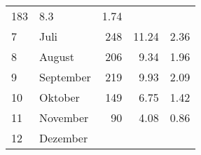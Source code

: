 \begin{longtable}{lXrrr}
       \num{183} &
       \num[round-mode=places,round-precision=2]{8.3} &
         \num[round-mode=places,round-precision=2]{1.74} \\

     7 &
     \multicolumn{1}{X}{ Juli   } &


       \num{248} &
       \num[round-mode=places,round-precision=2]{11.24} &
         \num[round-mode=places,round-precision=2]{2.36} \\

     8 &
     \multicolumn{1}{X}{ August   } &


       \num{206} &
       \num[round-mode=places,round-precision=2]{9.34} &
         \num[round-mode=places,round-precision=2]{1.96} \\

     9 &
     \multicolumn{1}{X}{ September   } &


       \num{219} &
       \num[round-mode=places,round-precision=2]{9.93} &
         \num[round-mode=places,round-precision=2]{2.09} \\

     10 &
     \multicolumn{1}{X}{ Oktober   } &


       \num{149} &
       \num[round-mode=places,round-precision=2]{6.75} &
         \num[round-mode=places,round-precision=2]{1.42} \\

     11 &
     \multicolumn{1}{X}{ November   } &


       \num{90} &
       \num[round-mode=places,round-precision=2]{4.08} &
         \num[round-mode=places,round-precision=2]{0.86} \\

     12 &
     \multicolumn{1}{X}{ Dezember   } &



\end{longtable}
